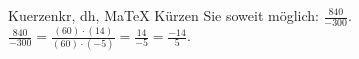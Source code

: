 \begin{MAufgabe}{Kuerzen}{kr, dh, MaTeX}
K\"urzen Sie soweit m\"oglich: $\frac{840}{-300}$.\\ 
\ifLsg\MLoesung
\quad $\frac{840}{-300}=\frac{(60)\cdot(14)}{(60)\cdot(-5)}=\frac{14}{-5}=\frac{-14}{5}$.\else\relax\fi
 \end{MAufgabe}